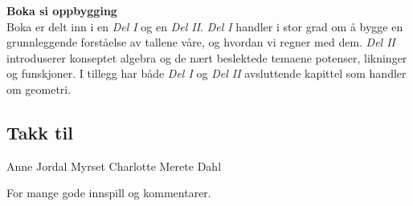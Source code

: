 \textbf{Boka si oppbygging}\\
Boka er delt inn i en \textsl{Del I} og en \textsl{Del II}. \textsl{Del I} handler i stor grad om å bygge en grunnleggende forståelse av tallene våre, og hvordan vi regner med dem. \textsl{Del II} introduserer konseptet algebra og de nært beslektede temaene potenser, likninger og funskjoner. I tillegg har både \textsl{Del I} og \textsl{Del II} avsluttende kapittel som handler om geometri. \vsk

\newpage
\subsection*{Takk til}
Anne Jordal Myrset \os
Charlotte Merete Dahl\vsk

For mange gode innspill og kommentarer.


